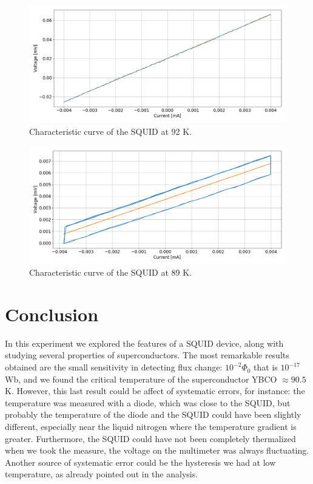 \documentclass[a4paper,10pt]{article}
\begin{document}
\begin{figure}[H]
\centering
\includegraphics[width = \textwidth]{92K}
\caption{Characteristic curve of the SQUID at 92 K.}\label{92}
\end{figure}
\begin{figure}[H]
\centering
\includegraphics[width = \textwidth]{89K}
\caption{Characteristic curve of the SQUID at 89 K.}\label{89}
\end{figure}
\section{Conclusion}
In this experiment we explored the features of a SQUID device, along with studying several properties of superconductors. The most remarkable results obtained are the small sensitivity in detecting flux change: $10^{-2} \Phi_0$ that is $10^{-17}$ Wb, and we found the critical temperature of the superconductor YBCO $\approx 90.5$ K. However, this last result could be affect
of systematic errors, for instance: the temperature was measured with a diode, which was close to the SQUID, but probably the temperature of the diode and the SQUID could have been slightly different, especially near the liquid nitrogen where the temperature gradient is greater. Furthermore, the SQUID could have not been completely thermalized when we took the measure, the voltage on the multimeter was always fluctuating. Another source of systematic error could be the hysteresis we had at low temperature, as already pointed out in the analysis.
\end{document}
